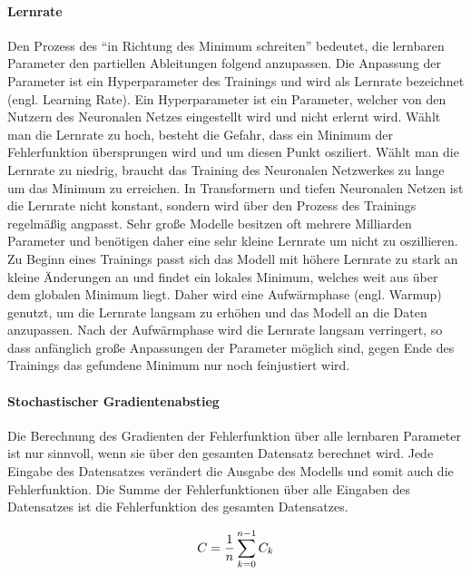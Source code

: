 \paragraph{Lernrate}
Den Prozess des \enquote{in Richtung des Minimum schreiten} bedeutet, die lernbaren Parameter den partiellen Ableitungen folgend anzupassen.
Die Anpassung der Parameter ist ein Hyperparameter des Trainings und wird als Lernrate bezeichnet (engl. Learning Rate).
Ein Hyperparameter ist ein Parameter, welcher von den Nutzern des Neuronalen Netzes eingestellt wird und nicht erlernt wird.
Wählt man die Lernrate zu hoch, besteht die Gefahr, dass ein Minimum der Fehlerfunktion übersprungen wird und um diesen Punkt osziliert.
Wählt man die Lernrate zu niedrig, braucht das Training des Neuronalen Netzwerkes zu lange um das Minimum zu erreichen.
In Transformern und tiefen Neuronalen Netzen ist die Lernrate nicht konstant, sondern wird über den Prozess des Trainings regelmäßig angpasst.
Sehr große Modelle besitzen oft mehrere Milliarden Parameter und benötigen daher eine sehr kleine Lernrate um nicht zu oszillieren.
Zu Beginn eines Trainings passt sich das Modell mit höhere Lernrate zu stark an kleine Änderungen an und findet ein lokales Minimum, welches weit aus über dem globalen Minimum liegt.
Daher wird eine Aufwärmphase (engl. Warmup) genutzt, um die Lernrate langsam zu erhöhen und das Modell an die Daten anzupassen.
Nach der Aufwärmphase wird die Lernrate langsam verringert, so dass anfänglich große Anpassungen der Parameter möglich sind, gegen Ende des Trainings das gefundene Minimum nur noch feinjustiert wird.\\

\paragraph{Stochastischer Gradientenabstieg}
Die Berechnung des Gradienten der Fehlerfunktion über alle lernbaren Parameter ist nur sinnvoll, wenn sie über den gesamten Datensatz berechnet wird.
Jede Eingabe des Datensatzes verändert die Ausgabe des Modells und somit auch die Fehlerfunktion.
Die Summe der Fehlerfunktionen über alle Eingaben des Datensatzes ist die Fehlerfunktion des gesamten Datensatzes.

\begin{equation}
    C = \frac{1}{n}\sum_{k=0}^{n-1}C_k\\
\end{equation}

